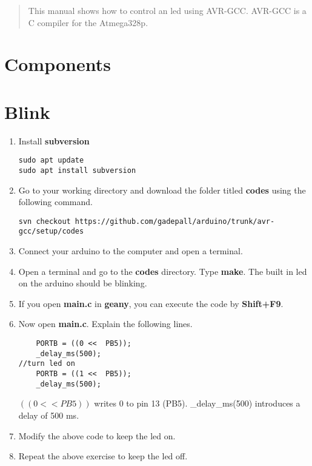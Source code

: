 \documentclass[journal,12pt,twocolumn]{IEEEtran}
\begin{document}
\tableofcontents

\bigskip

%
%
\begin{abstract}
This manual shows how to control an led using AVR-GCC. AVR-GCC
is a C compiler for the Atmega328p.
\end{abstract}
\renewcommand{\thefigure}{\theenumi}
\renewcommand{\thetable}{\theenumi}
\section{Components}

%
\section{Blink}
\begin{enumerate}[1.]
\item Install \textbf{subversion}
\begin{lstlisting}
sudo apt update
sudo apt install subversion
\end{lstlisting}
\item Go to your working directory and download the folder titled \textbf{codes} using the following command.
\begin{lstlisting}
svn checkout https://github.com/gadepall/arduino/trunk/avr-gcc/setup/codes
\end{lstlisting}
\item Connect your arduino to the computer and open a terminal. 
\item Open a terminal and go to  the \textbf{codes} directory.  Type \textbf{make}.  The built in led on the arduino should be blinking.
\item If you open \textbf{main.c} in \textbf{geany}, you can execute the code by \textbf{Shift+F9}.

\item Now open \textbf{main.c}. Explain the following lines.
\begin{lstlisting}
    PORTB = ((0 <<  PB5));
	_delay_ms(500);
//turn led on
    PORTB = ((1 <<  PB5));
    _delay_ms(500);
\end{lstlisting}
\solution $((0 <<  PB5))$ writes 0 to pin 13 (PB5).  \_delay\_ms(500) introduces a delay of 500 ms.  
\item Modify the above code to keep the led on.
\item Repeat the above exercise to keep the led off.

\end{enumerate}
\end{document}
